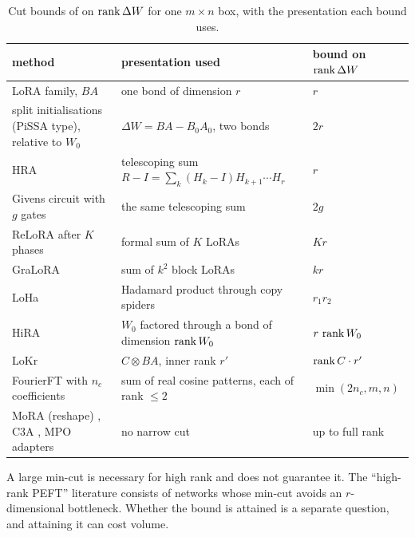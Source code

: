 \begin{table}[t]
  \centering
  \footnotesize
  \caption{Cut bounds of  on $\operatorname{rank}\Delta W$ for one $m\times n$ box, with the presentation each
    bound uses.}
  \label{tab:cutbounds}
  \renewcommand{\arraystretch}{1.12}
  \begin{tabularx}{\linewidth}{@{}>{\raggedright\arraybackslash}p{4.6cm}>{\raggedright\arraybackslash}X>{\raggedright\arraybackslash}p{2.6cm}@{}}
    \toprule
    \headrow \textbf{method} & \textbf{presentation used} & \textbf{bound on $\operatorname{rank}\Delta W$}\\
    \midrule
    LoRA family, $BA$ \citep{hu2021lora} & one bond of dimension $r$ & $r$\\
    split initialisations (PiSSA type), relative to $W_0$ & $\Delta W=BA-B_0A_0$, two bonds & $2r$\\
    HRA \citep{yuan2024bridging} & telescoping sum $R-I=\sum_k(H_k-I)H_{k+1}\cdots H_r$ & $r$\\
    Givens circuit with $g$ gates \citep{ma2024parameter} & the same telescoping sum & $2g$\\
    ReLoRA after $K$ phases \citep{lialin2023relora} & formal sum of $K$ LoRAs & $Kr$\\
    GraLoRA \citep{jung2025gralora} & sum of $k^2$ block LoRAs & $kr$\\
    LoHa \citep{hyeonwoo2021fedpara} & Hadamard product through copy spiders & $r_1r_2$\\
    HiRA \citep{huang2025hira} & $W_0$ factored through a bond of dimension $\operatorname{rank} W_0$ & $r\,\operatorname{rank} W_0$\\
    LoKr \citep{yeh2023navigating} & $C\otimes BA$, inner rank $r'$ & $\operatorname{rank} C\cdot r'$\\
    FourierFT with $n_c$ coefficients \citep{gao2024parameter} & sum of real cosine patterns, each of rank $\le2$ &
      $\min(2n_c,m,n)$\\
    MoRA (reshape) \citep{jiang2024mora}, C3A \citep{chen2024parameter}, MPO adapters \citep{xliu2021enabling} & no
      narrow cut & up to full rank\\
    \bottomrule
  \end{tabularx}
\end{table}

\begin{explains}
A large min-cut is necessary for high rank and does not guarantee it. The ``high-rank PEFT'' literature consists of
networks whose min-cut avoids an $r$-dimensional bottleneck. Whether the bound is attained is a separate question, and
attaining it can cost volume.
\end{explains}

